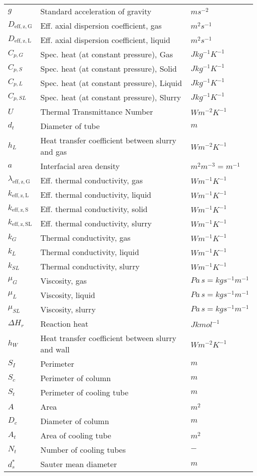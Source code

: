 \documentclass{article}
\begin{document}
\begin{center}
\begin{longtable}{lll}
			$g$ & Standard acceleration of gravity & $ms^{-2}$\\
			$D_{\mathrm{eff,z,G}}$ & Eff. axial dispersion coefficient, gas & $m^2s^{-1}$\\
			$D_{\mathrm{eff,z,L}}$ & Eff. axial dispersion coefficient, liquid & $m^2s^{-1}$\\
			$C_{p,G}$ & Spec. heat (at constant pressure), Gas & $J kg^{-1} K^{-1}$ \\
			$C_{p,S}$ & Spec. heat (at constant pressure), Solid & $J kg^{-1}  K^{-1}$\\
			$C_{p,L}$ & Spec. heat (at constant pressure), Liquid & $J kg^{-1}  K^{-1}$\\
			$C_{p,SL}$ & Spec. heat (at constant pressure), Slurry & $J kg^{-1}  K^{-1}$\\
			$U$ & Thermal Transmittance Number & $Wm^{-2}K^{-1}$ \\
			$d_t$ & Diameter of tube & $m$ \\
			$h_L$ & Heat transfer coefficient between slurry and gas & $W m^{-2}K^{-1}$ \\
			$a$ & Interfacial area density & $m^2m^{-3}=m^{-1}$ \\
			$\lambda_{\mathrm{eff,z,G}}$ & Eff. thermal conductivity, gas & $W m^{-1}K^{-1}$ \\
			$k_{\mathrm{eff,z,L}}$ & Eff. thermal conductivity, liquid & $W m^{-1}K^{-1}$ \\
			$k_{\mathrm{eff,z,S}}$ & Eff. thermal conductivity, solid & $W m^{-1}K^{-1}$ \\
			$k_{\mathrm{eff,z,SL}}$ & Eff. thermal conductivity, slurry & $W m^{-1}K^{-1}$ \\
			$k_G$ & Thermal conductivity, gas & $W m^{-1}K^{-1}$ \\ 
			$k_L$ & Thermal conductivity, liquid & $W m^{-1}K^{-1}$ \\
			$k_{SL}$ & Thermal conductivity, slurry & $W m^{-1}K^{-1}$ \\
			$\mu_G$ & Viscosity, gas & $Pa\,s=kg s^{-1} m^{-1}$ \\
			$\mu_L$ & Viscosity, liquid & $Pa\,s=kg s^{-1} m^{-1}$ \\
			$\mu_{SL}$ & Viscosity, slurry & $Pa\,s=kg s^{-1} m^{-1}$ \\
			$\Delta H_r$ & Reaction heat & $J kmol^{-1}$ \\
			$h_W$ & Heat transfer coefficient between slurry and wall & $W m^{-2}K^{-1}$ \\
			$S_I$ & Perimeter & $m$ \\
			$S_c$ & Perimeter of column & $m$\\
			$S_t$ & Perimeter of cooling tube & $m$\\
			$A$ & Area & $m^2$ \\
			$D_c$ & Diameter of column & $m$ \\
			$A_t$ & Area of cooling tube & $m^2$ \\
			$N_t$ & Number of cooling tubes & $-$ \\
			$d_s^*$ & Sauter mean diameter & $m$ \\
	\end{longtable}
\end{center}
\end{document}
